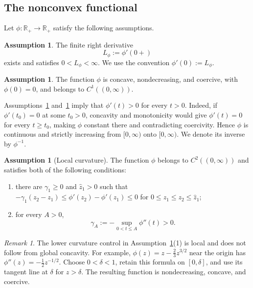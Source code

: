 \documentclass[11pt]{amsart}
\theoremstyle{definition}
\newtheorem{assumption}[theorem]{Assumption}
\theoremstyle{remark}
\newtheorem{remark}[theorem]{Remark}
\begin{document}
\subsection{The nonconvex functional}
Let $\phi:\mathbb{R}_+\to\mathbb{R}_+$ satisfy the following assumptions.
\begin{assumption}\label{pen1}
The finite right derivative
\begin{equation*}
	L_\phi:=\phi'(0+)
\end{equation*}
exists and satisfies $0<L_\phi<\infty$. We use the convention $\phi'(0):=L_\phi$.
\end{assumption}

\begin{assumption}\label{pen2}
The function $\phi$ is concave, nondecreasing, and coercive, with
$\phi(0)=0$, and belongs to $C^1((0,\infty))$.
\end{assumption}

Assumptions~\ref{pen1} and~\ref{pen2} imply that $\phi'(t)>0$ for every
$t>0$. Indeed, if
$\phi'(t_0)=0$ at some $t_0>0$, concavity and monotonicity would give
$\phi'(t)=0$ for every $t\ge t_0$, making $\phi$ constant there and
contradicting coercivity. Hence $\phi$ is continuous and strictly increasing
from $[0,\infty)$ onto $[0,\infty)$. We denote its inverse by $\phi^{-1}$.

\begin{assumption}[Local curvature]\label{pen3}
The function $\phi$ belongs to $C^2((0,\infty))$ and satisfies both of the
following conditions:
\begin{enumerate}
	\item there are $\gamma_1\ge0$ and $\hat z_1>0$ such that
	$-\gamma_1(z_2-z_1)\le\phi'(z_2)-\phi'(z_1)\le0$
	for $0\le z_1\le z_2\le\hat z_1$;
	\item for every $A>0$,
	\begin{equation*}
		\gamma_A:=-\sup_{0<t\le A}\phi''(t)>0.
	\end{equation*}
\end{enumerate}
\end{assumption}

\begin{remark}
The lower curvature control in Assumption~\ref{pen3}(1) is local and does not
follow from global concavity. For example,
$\phi(z)=z-\frac23z^{3/2}$ near the origin has
$\phi''(z)=-\frac12z^{-1/2}$.
Choose $0<\delta<1$, retain this formula on $[0,\delta]$, and use its
tangent line at $\delta$ for $z>\delta$. The resulting function is
nondecreasing, concave, and coercive.
\end{remark}
\end{document}
